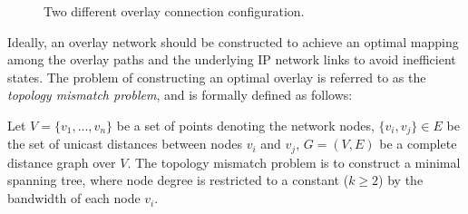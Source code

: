 \begin{figure}[ht]
\centering
{}\qquad\qquad
{}
\caption{Two different overlay connection configuration.}
\label{figure:overlay-confs}
\end{figure}

Ideally, an overlay network should be constructed to achieve an optimal 
mapping among the
overlay paths and the underlying IP network links to avoid inefficient states.
The problem of constructing an optimal overlay is referred to as the
\emph{topology mismatch problem}, and is formally defined as follows:
\begin{definition}
Let $V = \{v_1, ..., v_n\}$ be a set of points denoting the network nodes,
$\{v_i, v_j\} \in E$ be the set of unicast distances between nodes $v_i$ and
$v_j$, $G=(V,E)$ be a complete distance graph over $V$. The topology mismatch
problem is to construct a minimal spanning tree,  where node degree is
restricted to a constant ($k\geq 2$) by the bandwidth of each node $v_i$.
\end{definition}

